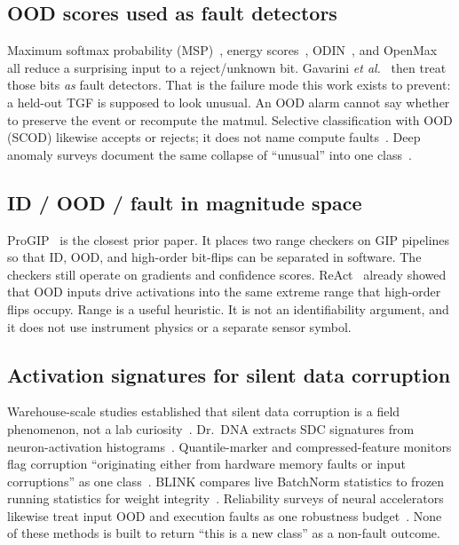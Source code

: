 \documentclass[journal]{IEEEtran}
\begin{document}
\subsection{OOD scores used as fault detectors}
Maximum softmax probability (MSP)~\cite{hendrycks2017}, energy scores~\cite{liu2020}, ODIN~\cite{liang2018}, and OpenMax~\cite{bendale2016} all reduce a surprising input to a reject/unknown bit. Gavarini \textit{et al.}~\cite{gavarini2022} then treat those bits \emph{as} fault detectors. That is the failure mode this work exists to prevent: a held-out TGF is supposed to look unusual. An OOD alarm cannot say whether to preserve the event or recompute the matmul. Selective classification with OOD (SCOD) likewise accepts or rejects; it does not name compute faults~\cite{sirc2022,narasimhan2024}. Deep anomaly surveys document the same collapse of ``unusual'' into one class~\cite{ruff2021,geng2020}.

\subsection{ID / OOD / fault in magnitude space}
ProGIP~\cite{progip2025} is the closest prior paper. It places two range checkers on GIP pipelines so that ID, OOD, and high-order bit-flips can be separated in software. The checkers still operate on gradients and confidence scores. ReAct~\cite{react2021} already showed that OOD inputs drive activations into the same extreme range that high-order flips occupy. Range is a useful heuristic. It is not an identifiability argument, and it does not use instrument physics or a separate sensor symbol.

\subsection{Activation signatures for silent data corruption}
Warehouse-scale studies established that silent data corruption is a field phenomenon, not a lab curiosity~\cite{hochschild2021,dixit2021}. Dr.~DNA extracts SDC signatures from neuron-activation histograms~\cite{drdna2024}. Quantile-marker and compressed-feature monitors flag corruption ``originating either from hardware memory faults or input corruptions'' as one class~\cite{geissler2023,schorn2020}. BLINK compares live BatchNorm statistics to frozen running statistics for weight integrity~\cite{blink2026}. Reliability surveys of neural accelerators likewise treat input OOD and execution faults as one robustness budget~\cite{mittal2020}. None of these methods is built to return ``this is a new class'' as a non-fault outcome.
\end{document}
